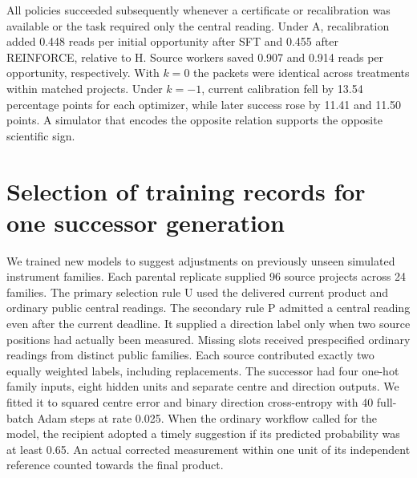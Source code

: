 \documentclass[11pt,a4paper]{article}
\begin{document}
All policies succeeded subsequently whenever a certificate or recalibration was available or the task required only the central reading. Under A, recalibration added 0.448 reads per initial opportunity after SFT and 0.455 after REINFORCE, relative to H. Source workers saved 0.907 and 0.914 reads per opportunity, respectively. With $k=0$ the packets were identical across treatments within matched projects. Under $k=-1$, current calibration fell by 13.54 percentage points for each optimizer, while later success rose by 11.41 and 11.50 points. A simulator that encodes the opposite relation supports the opposite scientific sign.

\section{Selection of training records for one successor generation}\label{sec:child}
We trained new models to suggest adjustments on previously unseen simulated instrument families. Each parental replicate supplied 96 source projects across 24 families. The primary selection rule U used the delivered current product and ordinary public central readings. The secondary rule P admitted a central reading even after the current deadline. It supplied a direction label only when two source positions had actually been measured. Missing slots received prespecified ordinary readings from distinct public families. Each source contributed exactly two equally weighted labels, including replacements. The successor had four one-hot family inputs, eight hidden units and separate centre and direction outputs. We fitted it to squared centre error and binary direction cross-entropy with 40 full-batch Adam steps at rate 0.025. When the ordinary workflow called for the model, the recipient adopted a timely suggestion if its predicted probability was at least 0.65. An actual corrected measurement within one unit of its independent reference counted towards the final product.
\end{document}
